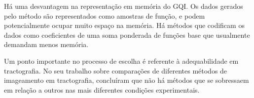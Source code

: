 \documentclass[
    12pt,                %
    oneside,            %
    a4paper,            %
    english,            %
    french,                %
    spanish,            %
    brazil                %
    ]{abntex2}
\begin{document}
Há uma desvantagem na representação em memória do GQI. Os dados gerados pelo método são representados como amostras de função, e podem potencialmente ocupar muito espaço na memória. Há métodos que codificam os dados como coeficientes de uma soma ponderada de funções base \cite{descoteaux2007_QBI, Tournier2004DirectEO, tournier2007} que usualmente demandam menos memória.

Um ponto importante no processo de escolha é referente à adequabilidade em tractografia. No seu trabalho sobre comparações de diferentes métodos de imageamento em tractografia,  concluíram que não há métodos que se sobressaem em relação a outros nas mais diferentes condições experimentais.




























\end{document}
